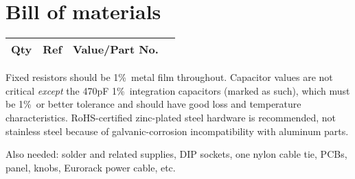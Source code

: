 
%
%
%
%
%
%

\onecolumn
\chapter{Bill of materials}

{\centering
{}

\begin{longtable}{rp{1in}cp{3in}}
  \textbf{Qty} & \textbf{Ref} & \textbf{Value/Part No.} & \\ \hline \endhead

\end{longtable}\par}

Fixed resistors should be 1\%\ metal film throughout.  Capacitor values
are not critical \emph{except} the 470pF 1\%\ integration capacitors
(marked as such), which must be 1\%\ or better tolerance and should have
good loss and temperature characteristics.
RoHS-certified zinc-plated steel hardware is recommended, not stainless
steel because of galvanic-corrosion incompatibility with aluminum parts.

Also needed:  solder and related supplies, DIP sockets, one nylon cable tie,
PCBs, panel, knobs, Eurorack power cable, etc.

\twocolumn
